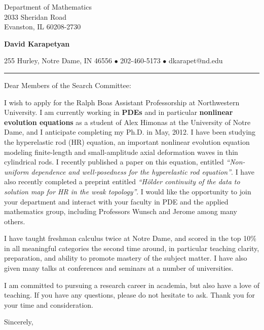 \documentclass[12pt]{letter}
\date{\vspace{0.5cm}\flushleft \today}
\begin{document}
\begin{letter}{Department of Mathematics\\
2033 Sheridan Road\\
Evanston, IL 60208-2730}
\begin{center}
{\bf {\Large David Karapetyan}}
\end{center}

\begin{center}
{255 Hurley, Notre Dame, IN 46556  $\bullet$
202-460-5173 $\bullet$ dkarapet@nd.edu
}
\end{center}
\hrule

\opening{Dear Members of the Search Committee:\\}
%
%
I wish to apply for the Ralph Boas Assistant Professorship at Northwestern
University. I am currently working in \textbf{PDEs}
and in particular \textbf{nonlinear evolution equations} as a student of Alex Himonas at the University of Notre Dame, and I
anticipate completing my Ph.D. in May, 2012. I have been
studying the hyperelastic rod (HR) equation, an important nonlinear evolution
equation modeling finite-length and small-amplitude axial deformation waves in
thin cylindrical rods. I recently published a paper on this equation, entitled
{\it ``Non-uniform dependence and well-posedness for the hyperelastic rod
equation''}. I have also recently completed a preprint entitled {\it ``H\"older
continuity of the data to solution map for HR in the weak topology''}.
I would like the opportunity to join your department 
and interact with your faculty in PDE and the applied mathematics group,
including Professors Wunsch and Jerome among many others.


I have taught freshman calculus twice at Notre Dame, and scored in the top 10\%
in all meaningful categories the second time around, in particular teaching
clarity, preparation, and ability to promote mastery of the subject matter. I
have also given many talks at conferences and seminars at a number of
universities. 

I am committed to pursuing a research career in academia, but also have a love
of teaching. If you have any questions, please do not hesitate to ask. Thank you for your time and consideration. 

\closing{Sincerely,}


\end{letter}
\end{document}
